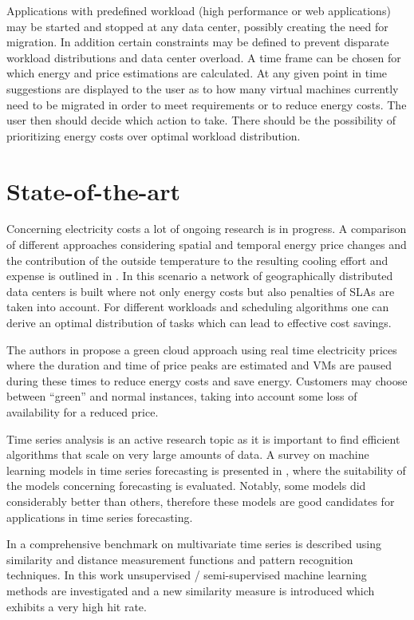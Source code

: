 \documentclass[a4paper]{article}
\begin{document}
Applications with predefined workload (high performance or web applications) may be started and stopped at any data center, possibly creating the need for migration. In addition certain constraints may be defined to prevent disparate workload distributions and data center overload. A time frame can be chosen for which energy and price estimations are calculated. At any given point in time suggestions are displayed to the user as to how many virtual machines currently need to be migrated in order to meet requirements or to reduce energy costs. The user then should decide which action to take. There should be the possibility of prioritizing energy costs over optimal workload distribution. 


\section{State-of-the-art}

Concerning electricity costs a lot of ongoing research is in progress. A comparison of different approaches considering spatial and temporal energy price changes and the contribution of the outside temperature to the resulting cooling effort and expense is outlined in \cite{guler2013cutting}. In this scenario a network of geographically distributed data centers is built where not only energy costs but also penalties of SLAs are taken into account. For different workloads and scheduling algorithms one can derive an optimal distribution of tasks which can lead to effective cost savings. 

The authors in \cite{lucanin2013take} propose a green cloud approach using real time electricity prices where the duration and time of price peaks are estimated and VMs are paused during these times to reduce energy costs and save energy. Customers may choose between “green” and normal instances, taking into account some loss of availability for a reduced price. 

Time series analysis is an active research topic as it is important to find efficient algorithms that scale on very large amounts of data. A survey on machine learning models in time series forecasting is presented in \cite{ahmed2010empirical}, where the suitability of the models concerning forecasting is evaluated. Notably, some models did considerably better than others, therefore these models are good candidates for applications in time series forecasting. 

In \cite{lin2011pattern} a comprehensive benchmark on multivariate time series is described using similarity and distance measurement functions and pattern recognition techniques. In this work unsupervised / semi-supervised machine learning methods are investigated and a new similarity measure is introduced which exhibits a very high hit rate. 
\end{document}
